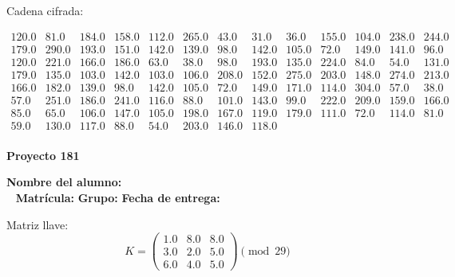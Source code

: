 \documentclass[12pt]{article}
\begin{document}
Cadena cifrada:
\begin{center}
$\begin{array}{lllllllllllll}
120.0 & 81.0 & 184.0 & 158.0 & 112.0 & 265.0 & 43.0 & 31.0 & 36.0 & 155.0 & 104.0 & 238.0 & 244.0\\
179.0 & 290.0 & 193.0 & 151.0 & 142.0 & 139.0 & 98.0 & 142.0 & 105.0 & 72.0 & 149.0 & 141.0 & 96.0\\
120.0 & 221.0 & 166.0 & 186.0 & 63.0 & 38.0 & 98.0 & 193.0 & 135.0 & 224.0 & 84.0 & 54.0 & 131.0\\
179.0 & 135.0 & 103.0 & 142.0 & 103.0 & 106.0 & 208.0 & 152.0 & 275.0 & 203.0 & 148.0 & 274.0 & 213.0\\
166.0 & 182.0 & 139.0 & 98.0 & 142.0 & 105.0 & 72.0 & 149.0 & 171.0 & 114.0 & 304.0 & 57.0 & 38.0\\
57.0 & 251.0 & 186.0 & 241.0 & 116.0 & 88.0 & 101.0 & 143.0 & 99.0 & 222.0 & 209.0 & 159.0 & 166.0\\
85.0 & 65.0 & 106.0 & 147.0 & 105.0 & 198.0 & 167.0 & 119.0 & 179.0 & 111.0 & 72.0 & 114.0 & 81.0\\
59.0 & 130.0 & 117.0 & 88.0 & 54.0 & 203.0 & 146.0 & 118.0\\
\end{array}$
\end{center}

\newpage


\textbf{Proyecto 181}

\textbf{Nombre del alumno:} \underline{\hspace{13cm}}\\\
\vspace{1cm}
\textbf{Matrícula:} \underline{\hspace{4cm}} \hspace{1cm}
\textbf{Grupo:} \underline{\hspace{2cm}}
\textbf{Fecha de entrega:} \underline{\hspace{2cm}}

\medskip

Matriz llave:
\[
K = \begin{pmatrix}
1.0 & 8.0 & 8.0\\
3.0 & 2.0 & 5.0\\
6.0 & 4.0 & 5.0
\end{pmatrix} \pmod{29}
\]
\end{document}
